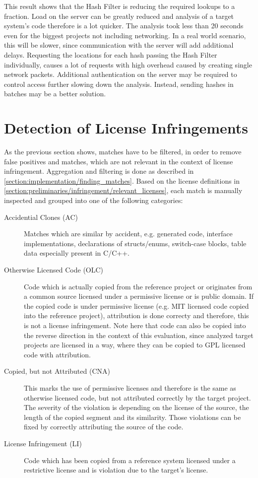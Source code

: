 This result shows that the Hash Filter is reducing the required lookups to a fraction.
Load on the server can be greatly reduced and analysis of a target system's code therefore is a lot quicker.
The analysis took less than 20 seconds even for the biggest projects not including networking.
In a real world scenario, this will be slower, since communication with the server will add additional delays.
Requesting the locations for each hash passing the Hash Filter individually, causes a lot of requests with high overhead caused by creating single network packets.
Additional authentication on the server may be required to control access further slowing down the analysis.
Instead, sending hashes in batches may be a better solution.

\newpage
\section{Detection of License Infringements}\label{section:evaluation/detecting_infringements}
As the previous section shows, matches have to be filtered, in order to remove false positives and matches, which are not relevant in the context of license infringement.
Aggregation and filtering is done as described in \autoref{section:implementation/finding_matches}.
Based on the license definitions in \autoref{section:preliminaries/infringement/relevant_licenses}, each match is manually inspected and grouped into one of the following categories:
\begin{description}
	\item [Accidential Clones (AC)]
		Matches which are similar by \glqq accident\grqq, e.g. generated code, interface implementations, declarations of structs/enums, switch-case blocks, table data especially present in C/C++.
	\item[Otherwise Licensed Code (OLC)]
		Code which is actually copied from the reference project or originates from a common source licensed under a permissive license or is public domain.
		If the copied code is under permissive license (e.g. MIT licensed code copied into the reference project), attribution is done correcty and therefore, this is not a license infringement.
		Note here that code can also be copied into the reverse direction in the context of this evaluation, since analyzed target projects are licensed in a way, where they can be copied to GPL licensed code with attribution.
	\item[Copied, but not Attributed (CNA)]
		This marks the use of permissive licenses and therefore is the same as otherwise licensed code, but not attributed correctly by the target project.
		The severity of the violation is depending on the license of the source, the length of the copied segment and its similarity.
		Those violations can be fixed by correctly attributing the source of the code.
	\item[License Infringement (LI)]
		Code which has been copied from a reference system licensed under a restrictive license and is violation due to the target's license.
\end{description}

